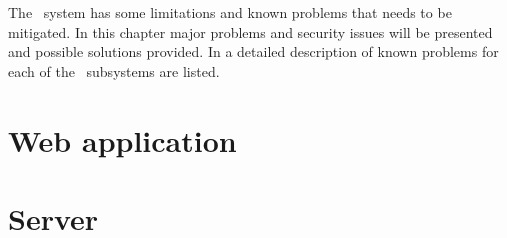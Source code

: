 The \appName\ system has some limitations and known problems that needs to be
mitigated. In this chapter major problems and security issues will be presented
and possible solutions provided. In  a detailed
description of known problems for each of the \appName\ subsystems are listed.

\section{Web application}


\FloatBarrier

\section{Server}



